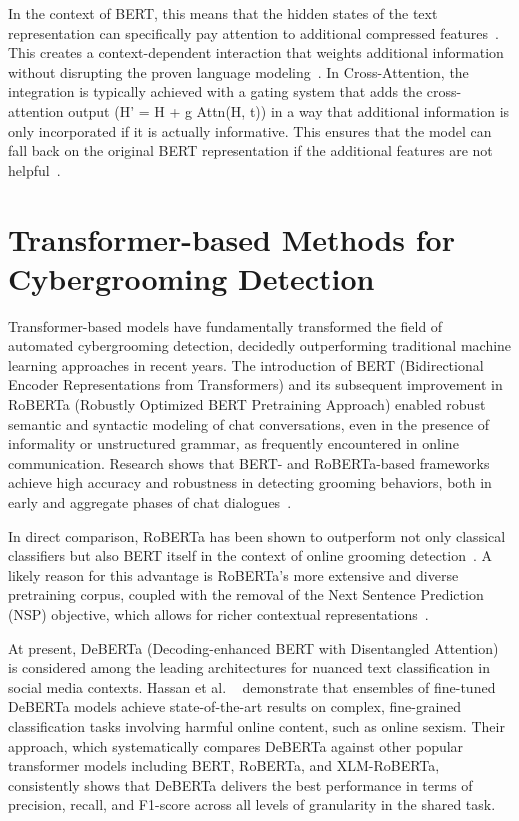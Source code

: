 In the context of BERT, this means that the hidden states of the text representation can specifically pay attention to additional compressed features~\parencite{biggiogera2021,cai2025multimodal}. This creates a context-dependent interaction that weights additional information without disrupting the proven language modeling~\parencite{cai2025multimodal}.    
In Cross-Attention, the integration is typically achieved with a gating system that adds the cross-attention output (H' = H + g \odot Attn(H, t)) in a way that additional information is only incorporated if it is actually informative. This ensures that the model can fall back on the original BERT representation if the additional features are not helpful~\parencite{cai2025multimodal}.

\section{Transformer-based Methods for Cybergrooming Detection}

Transformer-based models have fundamentally transformed the field of automated cybergrooming detection, decidedly outperforming traditional machine learning approaches in recent years. The introduction of BERT (Bidirectional Encoder Representations from Transformers) and its subsequent improvement in RoBERTa (Robustly Optimized BERT Pretraining Approach) enabled robust semantic and syntactic modeling of chat conversations, even in the presence of informality or unstructured grammar, as frequently encountered in online communication. Research shows that BERT- and RoBERTa-based frameworks achieve high accuracy and robustness in detecting grooming behaviors, both in early and aggregate phases of chat dialogues~\parencite{vogt2021early}. 

In direct comparison, RoBERTa has been shown to outperform not only classical classifiers but also BERT itself in the context of online grooming detection~\parencite{street2024grooming}. A likely reason for this advantage is RoBERTa’s more extensive and diverse pretraining corpus, coupled with the removal of the Next Sentence Prediction (NSP) objective, which allows for richer contextual representations~\parencite{liu2019roberta}. %

At present, DeBERTa (Decoding-enhanced BERT with Disentangled Attention) is considered among the leading architectures for nuanced text classification in social media contexts. Hassan et al. ~\parencite{hassan2023fircatsemeval} demonstrate that ensembles of fine-tuned DeBERTa models achieve state-of-the-art results on complex, fine-grained classification tasks involving harmful online content, such as online sexism. Their approach, which systematically compares DeBERTa against other popular transformer models including BERT, RoBERTa, and XLM-RoBERTa, consistently shows that DeBERTa delivers the best performance in terms of precision, recall, and F1-score across all levels of granularity in the shared task. %

